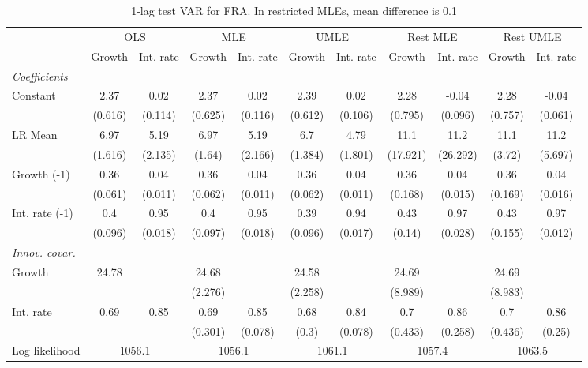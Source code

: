 \begin{table}[htbp] 
	\centering
	\begin{tabular}{@{\extracolsep{4pt}}lcccccccccc@{}}		\hline\hline
		 		 & \multicolumn{2}{c}{OLS} &\multicolumn{2}{c}{MLE} &\multicolumn{2}{c}{UMLE} &\multicolumn{2}{c}{Rest MLE} &\multicolumn{2}{c}{Rest UMLE} \\ 
 		 & Growth 	 & Int. rate 	 & Growth 	 & Int. rate 	 & Growth 	 & Int. rate 	 & Growth 	 & Int. rate 	 & Growth 	 & Int. rate\\\cline{2-3}\cline{4-5}\cline{6-7}\cline{8-9}\cline{10-11}
\rule{0pt}{4ex} 
 \emph{Coefficients} 	  		 & 		 & 		 & 		 & 		 & 		 & 		 & 		 & 		 & 		 &\\ 
\quad Constant 	 & 2.37 	 & 0.02 	 & 2.37 	 & 0.02 	 & 2.39 	 & 0.02 	 & 2.28 	 & -0.04 	 & 2.28 	 & -0.04	 \\ 
 		 & (0.616) 	 & (0.114) 	 & (0.625) 	 & (0.116) 	 & (0.612) 	 & (0.106) 	 & (0.795) 	 & (0.096) 	 & (0.757) 	 & (0.061) 	 \\ 
\quad LR Mean 	 & 6.97 	 & 5.19 	 & 6.97 	 & 5.19 	 & 6.7 	 & 4.79 	 & 11.1 	 & 11.2 	 & 11.1 	 & 11.2	 \\ 
 		 & (1.616) 	 & (2.135) 	 & (1.64) 	 & (2.166) 	 & (1.384) 	 & (1.801) 	 & (17.921) 	 & (26.292) 	 & (3.72) 	 & (5.697) 	 \\ 
\quad Growth (-1) 	 &0.36 	 & 0.04 	 & 0.36 	 & 0.04 	 & 0.36 	 & 0.04 	 & 0.36 	 & 0.04 	 & 0.36 	 & 0.04	 \\ 
 		 & (0.061) 	 & (0.011) 	 & (0.062) 	 & (0.011) 	 & (0.062) 	 & (0.011) 	 & (0.168) 	 & (0.015) 	 & (0.169) 	 & (0.016) 	 \\ 
\quad Int. rate (-1) 	 &0.4 	 & 0.95 	 & 0.4 	 & 0.95 	 & 0.39 	 & 0.94 	 & 0.43 	 & 0.97 	 & 0.43 	 & 0.97	 \\ 
 		 & (0.096) 	 & (0.018) 	 & (0.097) 	 & (0.018) 	 & (0.096) 	 & (0.017) 	 & (0.14) 	 & (0.028) 	 & (0.155) 	 & (0.012) 	 \\ 
\rule{0pt}{4ex} \emph{Innov. covar.}  	 & 	 & 	 & 	 & 	 & 	 & 	 & 	 & 	 & 	 &\\ 
\quad Growth 	 &24.78 	 &  	 & 24.68 	 &  	 & 24.58 	 &  	 & 24.69 	 &  	 & 24.69 	 & 	 \\ 
 		 &  	 &  	 & (2.276) 	 &  	 & (2.258) 	 &  	 & (8.989) 	 &  	 & (8.983) 	 &  	 \\ 
\quad Int. rate 	 &0.69 	 & 0.85 	 & 0.69 	 & 0.85 	 & 0.68 	 & 0.84 	 & 0.7 	 & 0.86 	 & 0.7 	 & 0.86	 \\ 
 		 &  	 &  	 & (0.301) 	 & (0.078) 	 & (0.3) 	 & (0.078) 	 & (0.433) 	 & (0.258) 	 & (0.436) 	 & (0.25) 	 \\ 
 \hline \rule{0pt}{4ex} 
  Log likelihood 	 &\multicolumn{2}{c}{1056.1} 	 & \multicolumn{2}{c}{1056.1} 	 & \multicolumn{2}{c}{1061.1} 	 & \multicolumn{2}{c}{1057.4} 	 & \multicolumn{2}{c}{1063.5}\\ 

 \hline 	\end{tabular}		\caption{1-lag test VAR for FRA. In restricted MLEs, mean difference is 0.1}
		\label{tab:FRA1lag}

\end{table}